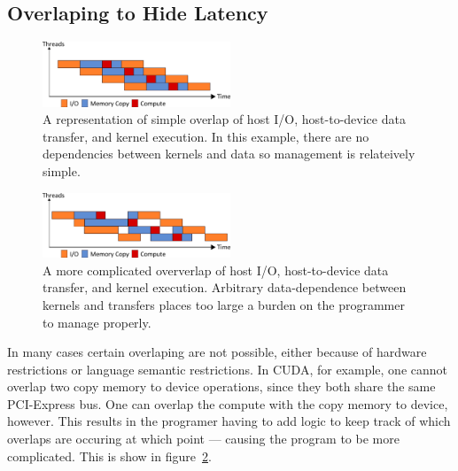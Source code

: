 \subsection{Overlaping to Hide Latency}



\begin{figure}
  \centering
    \includegraphics[width=0.5\textwidth]{fig/ord.png}
  \caption{A representation of simple overlap of host I/O, host-to-device data
           transfer, and kernel execution. In this example, there are no
           dependencies between kernels and data so management is relateively
           simple.}
  \label{fig:unord}
\end{figure}

\begin{figure}
  \centering
    \includegraphics[width=0.5\textwidth]{fig/unord.png}
  \caption{A more complicated oververlap of host I/O, host-to-device data
           transfer, and kernel execution. Arbitrary data-dependence between
           kernels and transfers places too large a burden on the programmer
           to manage properly.}
  \label{fig:unord}
\end{figure}

In many cases certain overlaping are not possible, either because of
  hardware restrictions or language semantic restrictions.
In CUDA, for example, one cannot overlap two copy memory to device
  operations, since they both share the same PCI-Express bus.
One can overlap the compute with the copy memory to device, however.
This results in the programer having to add logic to keep track of which
  overlaps are occuring at which point --- causing the program to be
  more complicated.
This is show in figure~\ref{fig:unord}.

 

